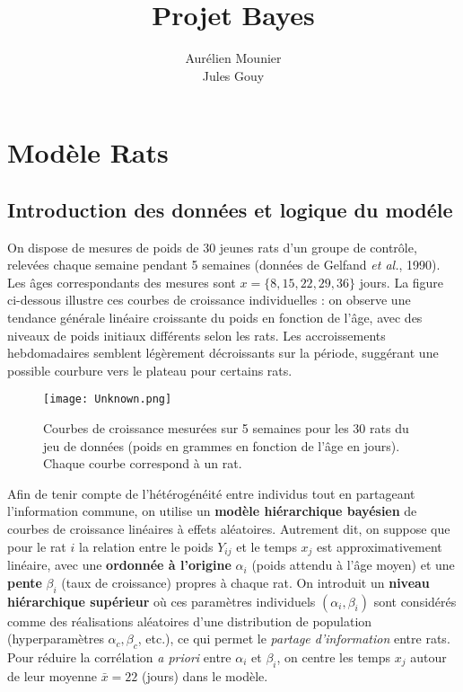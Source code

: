 \documentclass[12pt]{article}
\title{\textbf{Projet Bayes}}
\author{Aur\'elien Mounier \\ Jules Gouy}
\date{}
\begin{document}
\maketitle
\section{Modèle Rats}
\subsection{Introduction des donn\'ees et logique du mod\'ele}
On dispose de mesures de poids de 30 jeunes rats d’un groupe de contr\^ole, relev\'ees chaque semaine pendant 5 semaines (donn\'ees de Gelfand \emph{et al.}, 1990). Les \^ages correspondants des mesures sont $x=\{8, 15, 22, 29, 36\}$ jours. La figure ci-dessous illustre ces courbes de croissance individuelles : on observe une tendance g\'en\'erale lin\'eaire croissante du poids en fonction de l’\^age, avec des niveaux de poids initiaux diff\'erents selon les rats. Les accroissements hebdomadaires semblent l\'eg\`erement d\'ecroissants sur la p\'eriode, sugg\'erant une possible courbure vers le plateau pour certains rats.  

\begin{figure}[h!]
  \centering
  \texttt{[image: Unknown.png]}
  \caption{Courbes de croissance mesur\'ees sur 5 semaines pour les 30 rats du jeu de donn\'ees (poids en grammes en fonction de l’\^age en jours). Chaque courbe correspond \`a un rat.}
\end{figure}

Afin de tenir compte de l’h\'et\'erog\'en\'eit\'e entre individus tout en partageant l’information commune, on utilise un \textbf{mod\`ele hi\'erarchique bay\'esien} de courbes de croissance lin\'eaires \`a effets al\'eatoires. Autrement dit, on suppose que pour le rat $i$ la relation entre le poids $Y_{ij}$ et le temps $x_j$ est approximativement lin\'eaire, avec une \textbf{ordonn\'ee \`a l’origine} $\alpha_i$ (poids attendu \`a l’\^age moyen) et une \textbf{pente} $\beta_i$ (taux de croissance) propres \`a chaque rat. On introduit un \textbf{niveau hi\'erarchique sup\'erieur} o\`u ces param\`etres individuels $(\alpha_i, \beta_i)$ sont consid\'er\'es comme des r\'ealisations al\'eatoires d’une distribution de population (hyperparam\`etres $\alpha_c, \beta_c$, etc.), ce qui permet le \textit{partage d’information} entre rats. Pour r\'eduire la corr\'elation \textit{a priori} entre $\alpha_i$ et $\beta_i$, on centre les temps $x_j$ autour de leur moyenne $\bar{x}=22$ (jours) dans le mod\`ele.
\end{document}
